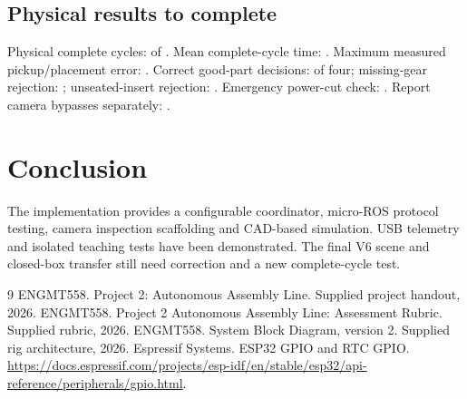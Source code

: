 \documentclass{article}
\begin{document}
\subsection{Physical results to complete}
Physical complete cycles: \PhysicalSuccesses{} of
\PhysicalTrials{}. Mean complete-cycle time: \MeanCycleTime{}.
Maximum measured pickup/placement error: \MaxPositionError{}.
Correct good-part decisions: \GoodAccepted{} of four;
missing-gear rejection: \MissingGearResult{};
unseated-insert rejection: \InsertResult{}.
Emergency power-cut check: \EmergencyStopResult{}.
Report camera bypasses separately: \CameraBypasses{}.

\section{Conclusion}
The implementation provides a configurable coordinator, micro-ROS protocol testing, camera inspection scaffolding and CAD-based simulation. USB telemetry and isolated teaching tests have been demonstrated. The final V6 scene and closed-box transfer still need correction and a new complete-cycle test. 

\small
\begin{thebibliography}{9}
 ENGMT558. Project 2: Autonomous Assembly Line. Supplied project handout, 2026.
 ENGMT558. Project 2 Autonomous Assembly Line: Assessment Rubric. Supplied rubric, 2026.
 ENGMT558. System Block Diagram, version 2. Supplied rig architecture, 2026.
 Espressif Systems. ESP32 GPIO and RTC GPIO. \url{https://docs.espressif.com/projects/esp-idf/en/stable/esp32/api-reference/peripherals/gpio.html}.
\end{thebibliography}
\end{document}
